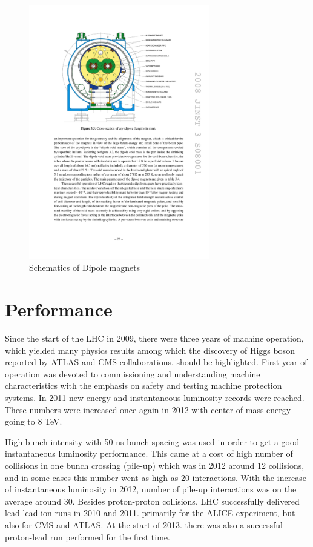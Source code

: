 \begin{figure}[htbp]
	\centering
		\includegraphics[width=0.7\textwidth]{Figures/LHC_magnet.pdf}
	\caption[Schematics of dipole magnets]{Schematics of Dipole magnets}
	\label{fig:LHC_mag}
\end{figure}


\section{Performance}

Since the start of the LHC in 2009, there were three years of machine operation, which yielded many physics results among which the discovery of Higgs boson reported by ATLAS and CMS collaborations. should be highlighted. First year of operation was devoted to commissioning and understanding machine characteristics with the emphasis on safety and testing machine protection systems. In 2011 new energy and instantaneous luminosity records were reached. These numbers were increased once again in 2012 with center of mass energy going to 8 TeV.
\par High bunch intensity with 50 ns bunch spacing was used in order to get a good instantaneous luminosity performance. This came at a cost of high number of collisions in one bunch crossing (pile-up) which was in 2012 around 12 collisions, and in some cases this number went as high as 20 interactions. With the increase of instantaneous luminosity in 2012, number of pile-up interactions was on the average around 30. Besides proton-proton collisions, LHC successfully delivered lead-lead ion runs in 2010 and 2011. primarily for the ALICE experiment, but also for CMS and ATLAS. At the start of 2013. there was also a successful proton-lead run performed for the first time. 

